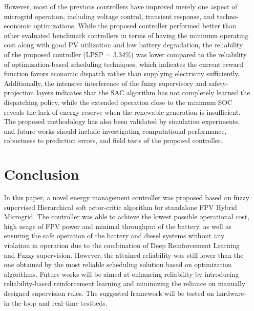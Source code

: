 \documentclass[journal]{IEEEtran}
\begin{document}
However, most of the previous controllers have improved merely one aspect of microgrid operation, including voltage control, transient response, and techno-economic optimizations. While the proposed controller performed better than other evaluated benchmark controllers in terms of having the minimum operating cost along with good PV utilization and low battery degradation, the reliability of the proposed controller (LPSP = 3.34\%) was lower compared to the reliability of optimization-based scheduling techniques, which indicates the current reward function favors economic dispatch rather than supplying electricity sufficiently. Additionally, the intensive interference of the fuzzy supervisory and safety-projection layers indicates that the SAC algorithm has not completely learned the dispatching policy, while the extended operation close to the minimum SOC reveals the lack of energy reserve when the renewable generation is insufficient. The proposed methodology has also been validated by simulation experiments, and future works should include investigating computational performance, robustness to prediction errors, and field tests of the proposed controller.
\section{Conclusion}

In this paper, a novel energy management controller was proposed based on fuzzy supervised Hierarchical soft actor-critic algorithm for standalone FPV Hybrid Microgrid. The controller was able to achieve the lowest possible operational cost, high usage of FPV power and minimal throughput of the battery, as well as ensuring the safe operation of the battery and diesel systems without any violation in operation due to the combination of Deep Reinforcement Learning and Fuzzy supervision. However, the attained reliability was still lower than the one obtained by the most reliable scheduling solution based on optimization algorithms. Future works will be aimed at enhancing reliability by introducing reliability-based reinforcement learning and minimizing the reliance on manually designed supervision rules. The suggested framework will be tested on hardware-in-the-loop and real-time testbeds.




\end{document}
